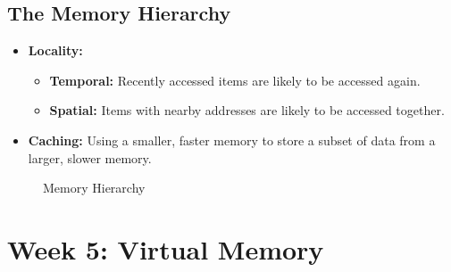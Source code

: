 \documentclass[10pt]{article}
\begin{document}
\subsection{The Memory Hierarchy}
\begin{itemize}
    \item \textbf{Locality:}
    \begin{itemize}
        \item \textbf{Temporal:} Recently accessed items are likely to be accessed again.
        \item \textbf{Spatial:} Items with nearby addresses are likely to be accessed together.
    \end{itemize}
    \item \textbf{Caching:} Using a smaller, faster memory to store a subset of data from a larger, slower memory.
\end{itemize}
\begin{figure}[h]
    \centering
    \caption{Memory Hierarchy}
\end{figure}

\section{Week 5: Virtual Memory}
\end{document}
